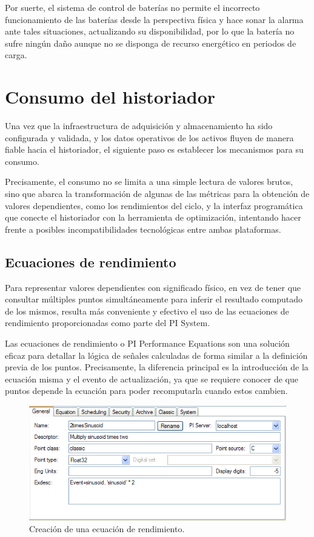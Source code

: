 Por suerte, el sistema de control de baterías no permite el incorrecto funcionamiento de las baterías desde la perspectiva física y hace sonar la alarma ante tales situaciones, actualizando su disponibilidad, por lo que la batería no sufre ningún daño aunque no se disponga de recurso energético en periodos de carga.

\section{Consumo del historiador}
\label{makereference3.5}

Una vez que la infraestructura de adquisición y almacenamiento ha sido configurada y validada, y los datos operativos de los activos fluyen de manera fiable hacia el historiador, el siguiente paso es establecer los mecanismos para su consumo.

Precisamente, el consumo no se limita a una simple lectura de valores brutos, sino que abarca la transformación de algunas de las métricas para la obtención de valores dependientes, como los rendimientos del ciclo, y la interfaz programática que conecte el historiador con la herramienta de optimización, intentando hacer frente a posibles incompatibilidades tecnológicas entre ambas plataformas.

\subsection{Ecuaciones de rendimiento}
\label{makereference3.5.1}

Para representar valores dependientes con significado físico, en vez de tener que consultar múltiples puntos simultáneamente para inferir el resultado computado de los mismos, resulta más conveniente y efectivo el uso de las ecuaciones de rendimiento proporcionadas como parte del PI System.

Las ecuaciones de rendimiento o PI Performance Equations son una solución eficaz para detallar la lógica de señales calculadas de forma similar a la definición previa de los puntos. Precisamente, la diferencia principal es la introducción de la ecuación misma y el evento de actualización, ya que se requiere conocer de que puntos depende la ecuación para poder recomputarla cuando estos cambien.

\begin{figure}
  \centering
  \includegraphics[width=0.5\linewidth]{figures/ecuaciones-de-rendimiento.png}
  \caption[Creación de una ecuación de rendimiento.]{Creación de una ecuación de rendimiento.}
  \label{fig:ecuaciones-de-rendimiento}
\end{figure}

